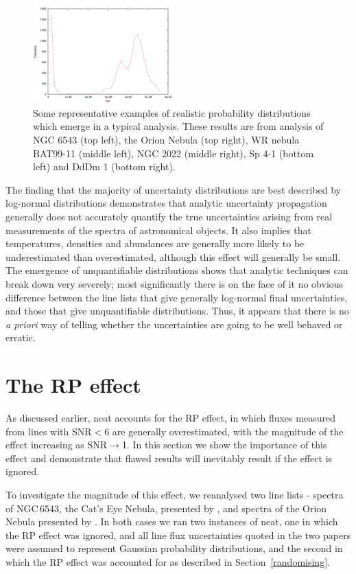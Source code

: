 \documentclass[useAMS,usenatbib]{mn2e}
\begin{document}
\begin{figure}
\includegraphics[width=0.48\textwidth]{figures/plot_binned_DdDm1-3_S_abund_CEL.png}
\caption{Some representative examples of realistic probability distributions which emerge in a typical analysis.  These results are from analysis of NGC 6543 (top left), the Orion Nebula (top right), WR nebula BAT99-11 (middle left), NGC 2022 (middle right), Sp 4-1 (bottom left) and DdDm 1 (bottom right).}
\label{Typical_uncertainties_images}
\end{figure}

The finding that the majority of uncertainty distributions are best described by log-normal distributions demonstrates that analytic uncertainty propagation generally does not accurately quantify the true uncertainties arising from real measurements of the spectra of astronomical objects.  It also implies that temperatures, densities and abundances are generally more likely to be underestimated than overestimated, although this effect will generally be small.  The emergence of unquantifiable distributions shows that analytic techniques can break down very severely; most significantly there is on the face of it no obvious difference between the line lists that give generally log-normal final uncertainties, and those that give unquantifiable distributions.  Thus, it appears that there is no {\it a priori} way of telling whether the uncertainties are going to be well behaved or erratic.

\section{The RP effect}
\label{RPeffect}

As discussed earlier, {\sc neat} accounts for the RP effect, in which fluxes measured from lines with SNR$<$6 are generally overestimated, with the magnitude of the effect increasing as SNR$\to$1.  In this section we show the importance of this effect and demonstrate that flawed results will inevitably result if the effect is ignored.

To investigate the magnitude of this effect, we reanalysed two line lists - spectra of NGC\,6543, the Cat's Eye Nebula, presented by \citet{2004MNRAS.351.1026W}, and spectra of the Orion Nebula presented by \citet{2004MNRAS.355..229E}.  In both cases we ran two instances of {\sc neat}, one in which the RP effect was ignored, and all line flux uncertainties quoted in the two papers were assumed to represent Gaussian probability distributions, and the second in which the RP effect was accounted for as described in Section~\ref{randomising}.
\end{document}
